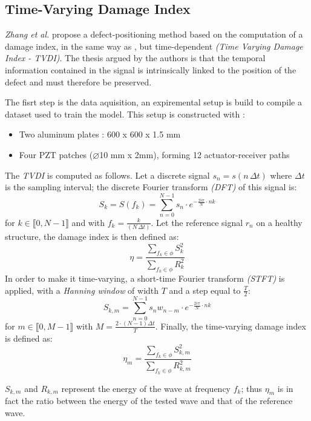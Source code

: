 \documentclass[12pt]{article}
\begin{document}
\subsection{Time-Varying Damage Index}
 
\textit{Zhang et al.} \cite{ZHANG2021107107} propose a defect-positioning method based on the computation of a damage index, in the same way as \cite{MUSTAPHA20071885}, but time-dependent \textit{(Time Varying Damage Index - TVDI)}. The thesis argued by the authors is that the temporal information contained in the signal is intrinsically linked to the position of the defect and must therefore be preserved.

 The fisrt step is the data aquisition, an expiremental setup is build to compile a dataset used to train the model. This setup is constructed with : 

\begin{itemize}[itemsep=8pt]
    
    \item Two aluminum plates : 600 x 600 x 1.5 mm
    \item Four PZT patches ($\varnothing$10 mm x 2mm), forming 12 actuator-receiver paths

\end{itemize}

The \textit{TVDI} is computed as follows. Let a discrete signal $s_n = s(n\,\Delta t)$ where $\Delta t$ is the sampling interval; the discrete Fourier transform \textit{(DFT)} of this signal is:  
$$
S_k = S(f_k) = \sum_{n=0}^{N-1} s_n \cdot e^{-\frac{2i\pi}{N} \cdot nk}
$$
for $k \in \llbracket 0, N-1 \rrbracket$ and with $f_k = \frac{k}{(N\,\Delta t)}$. Let the reference signal $r_n$ on a healthy structure, the damage index is then defined as:
$$
\eta = \frac{\sum_{f_k \in \phi} S_k^{2}}{\sum_{f_k \in \phi} R_k^{2}}
$$
In order to make it time-varying, a short-time Fourier transform \textit{(STFT)} is applied, with a \textit{Hanning window} of width $T$ and a step equal to $\frac{T}{2}$:
$$
S_{k,m} = \sum_{n=0}^{N-1} s_n w_{n-m}\cdot e^{-\frac{2i\pi}{N} \cdot nk}
$$
for $m \in \llbracket 0, M-1 \rrbracket$ with $M = \frac{2 \cdot (N-1) \Delta t}{T}$. Finally, the time-varying damage index is defined as: 
$$
\eta_m = \frac{\sum_{f_k \in \phi} S_{k,m}^{2}}{\sum_{f_k \in \phi} R_{k,m}^{2}}
$$

$S_{k,m}$ and $R_{k,m}$ represent the energy of the wave at frequency $f_k$; thus $\eta_m$ is in fact the ratio between the energy of the tested wave and that of the reference wave. 
 
\end{document}
